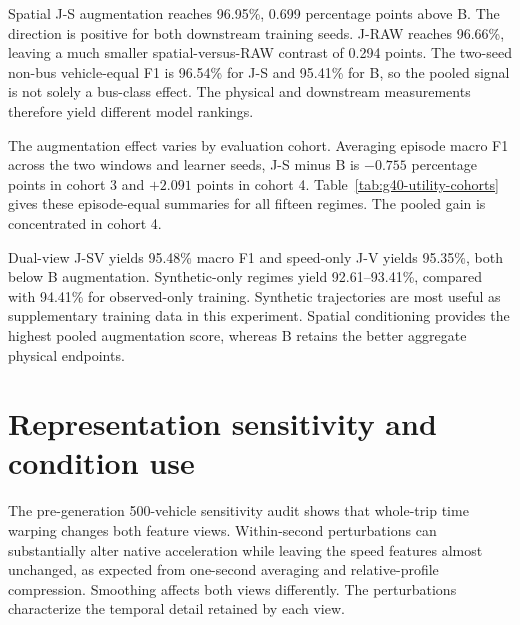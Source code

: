Spatial J-S augmentation reaches 96.95\%, 0.699 percentage points above B. The direction is positive for both downstream training seeds. J-RAW reaches 96.66\%, leaving a much smaller spatial-versus-RAW contrast of 0.294 points. The two-seed non-bus vehicle-equal F1 is 96.54\% for J-S and 95.41\% for B, so the pooled signal is not solely a bus-class effect. The physical and downstream measurements therefore yield different model rankings.



The augmentation effect varies by evaluation cohort. Averaging episode macro F1 across the two windows and learner seeds, J-S minus B is $-0.755$ percentage points in cohort 3 and $+2.091$ points in cohort 4. Table~\ref{tab:g40-utility-cohorts} gives these episode-equal summaries for all fifteen regimes. The pooled gain is concentrated in cohort 4.

Dual-view J-SV yields 95.48\% macro F1 and speed-only J-V yields 95.35\%, both below B augmentation. Synthetic-only regimes yield 92.61--93.41\%, compared with 94.41\% for observed-only training. Synthetic trajectories are most useful as supplementary training data in this experiment. Spatial conditioning provides the highest pooled augmentation score, whereas B retains the better aggregate physical endpoints.

\FloatBarrier
\section{Representation sensitivity and condition use}
The pre-generation 500-vehicle sensitivity audit shows that whole-trip time warping changes both feature views. Within-second perturbations can substantially alter native acceleration while leaving the speed features almost unchanged, as expected from one-second averaging and relative-profile compression. Smoothing affects both views differently. The perturbations characterize the temporal detail retained by each view.


